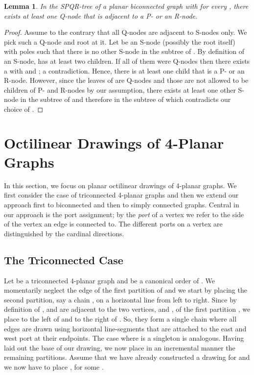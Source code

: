 \documentclass[a4paper,twoside,11pt]{article}
\newtheorem{lemma}{Lemma}
\begin{document}
\begin{lemma}
In the SPQR-tree  of a planar biconnected graph  with  for every , there exists at
least one Q-node that is adjacent to a P- or an R-node.
\label{lem:pr_node}
\end{lemma}
\begin{proof}
Assume to the contrary that all Q-nodes are adjacent to S-nodes
only. We pick such a Q-node and root  at it. Let 
be an S-node (possibly the root itself) with poles  such that there is no other S-node in the subtree of
. By definition of an S-node,  has at least two children.
If all of them were Q-nodes then there exists a 
with  and ; a contradiction. Hence,
there is at least one child  that is a P- or an R-node.
However, since the leaves of  are Q-nodes and those are
not allowed to be children of P- and R-nodes by our assumption,
there exists at least one other S-node in the subtree of  and
therefore in the subtree of  which contradicts our choice of
.
\end{proof}


\section{Octilinear Drawings of 4-Planar Graphs}
\label{sec:4planar}


In this section, we focus on planar octilinear drawings of 4-planar
graphs. We first consider the case of triconnected 4-planar graphs
and then we extend our approach first to biconnected and then to
simply connected graphs. Central in our approach is the port
assignment; by the \emph{port} of a vertex we refer to the side of
the vertex an edge is connected to. The different ports on a vertex
are distinguished by the cardinal directions.

\subsection{The Triconnected Case}
\label{sec:4tricon}


Let  be a triconnected 4-planar graph and  be a canonical order of . We momentarily neglect
the edge  of the first partition  of  and we
start by placing the second partition, say a chain , on a horizontal line from left to right.
Since by definition of ,  and  are adjacent
to the two vertices,  and , of the first partition ,
we place  to the left of  and  to the right of
. So, they form a single chain where all edges are
drawn using horizontal line-segments that are attached to the east
and west port at their endpoints. The case where  is a
singleton is analogous. Having laid out the base of our drawing, we
now place in an incremental manner the remaining partitions. Assume
that we have already constructed a drawing for  and we now
have to place , for some .
\end{document}
